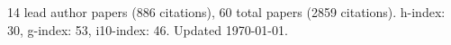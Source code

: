 14 lead author papers (886 citations),
60 total papers (2859 citations).\newline
h-index: 30, g-index: 53, i10-index: 46. Updated \today.